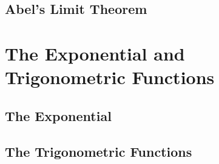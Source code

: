 \subsection{Abel's Limit Theorem}

\section{The Exponential and Trigonometric Functions}

\subsection{The Exponential}

\subsection{The Trigonometric Functions}

